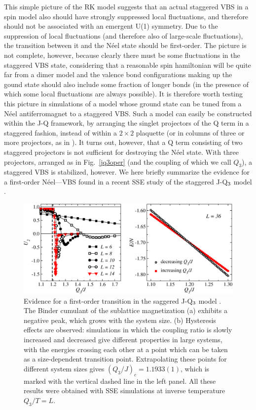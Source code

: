 \documentclass[draft,numberedheadings]{aipproc}
\begin{document}
This simple picture of the RK model suggests that an actual staggered VBS in a spin model also should have strongly suppressed local fluctuations, 
and therefore should not be associated with an emergent U(1) symmetry. Due to the suppression of local fluctuations (and therefore also of
large-scale fluctuations), the transition between it and the N\'eel state should be first-order. The picture is not complete, however, because 
clearly there must be some fluctuations in the staggered VBS state, considering that a reasonable spin hamiltonian will be quite far from a dimer 
model and the valence bond configurations making up the gound state should also include some fraction of longer bonds (in the presence of which some
local fluctuations are always possible). It is therefore worth testing this picture in simulations of a model whose ground state can be tuned 
from a N\'eel antiferromagnet to a staggered VBS. Such a model can easily be constructed within the J-Q framework, by arranging the singlet projectors 
of the Q term in a staggered fashion, instead of within a $2\times 2$ plaquette (or in columns of three or more projectors, as in \cite{lou1}). It turns 
out, however, that a Q term consisting of two staggered projectors is not sufficient for destroying the N\'eel state. With three projectors, arranged 
as in Fig.~\ref{jq3oper} (and the coupling of which we call $Q_3$), a staggered VBS is stabilized, however. We here briefly summarize the 
evidence for a first-order N\'eel---VBS found in a recent SSE study of the staggered J-Q$_{\rm 3}$ model \cite{arnab} .

\begin{figure}
\includegraphics[width=13.5cm, clip]{jq3data.eps}
\caption{Evidence for a first-order transition in the saggered J-Q$_{\rm 3}$ model \cite{arnab}. The Binder cumulant of the sublattice magnetization 
(a) exhibits a negative peak, which grows with the system size. (b) Hysteresis effects are observed: simulations in which the coupling ratio is
slowly increased and decreased give different properties in large systems, with the energies crossing each other at a point which can be
taken as a size-dependent transition point. Extrapolating these points for different system sizes gives $(Q_3/J)_c=1.1933(1)$, which is
marked with the vertical dashed line in the left panel. All these results were obtained with SSE simulations at inverse temperature
$Q_3/T=L$.}
\label{jq3data}
\end{figure}
\end{document}
